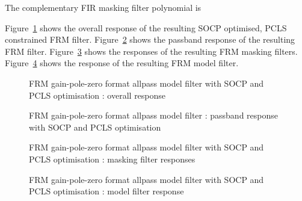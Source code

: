 \documentclass[a4paper,twoside,10pt,english]{report}
\begin{document}
The complementary FIR masking filter polynomial is
\begin{small}

\end{small}
Figure~\ref{fig:iir-frm-allpass-socp-pcls-response} 
shows the overall response of the resulting SOCP optimised, PCLS constrained
FRM filter. 
Figure~\ref{fig:iir-frm-allpass-socp-pcls-passband-response} 
shows the passband response of the resulting FRM filter. 
Figure~\ref{fig:iir-frm-allpass-socp-pcls-mask-response} 
shows the responses of the resulting FRM masking filters. 
Figure~\ref{fig:iir-frm-allpass-socp-pcls-model-response} 
shows the response of the resulting FRM model filter.
\begin{figure}[!htbp]
\begin{center}
\scalebox{0.7}{}
\caption{FRM gain-pole-zero format allpass model filter with SOCP and PCLS optimisation : overall response}
\label{fig:iir-frm-allpass-socp-pcls-response}
\end{center}
\end{figure}
\begin{figure}[!htbp]
\begin{center}
\scalebox{0.7}{}
\caption{FRM gain-pole-zero format allpass model filter : passband response with SOCP and PCLS optimisation}
\label{fig:iir-frm-allpass-socp-pcls-passband-response}
\end{center}
\end{figure}
\begin{figure}[!htbp]
\begin{center}
\scalebox{0.7}{}
\caption{FRM gain-pole-zero format allpass model filter with SOCP and PCLS optimisation : masking filter responses}
\label{fig:iir-frm-allpass-socp-pcls-mask-response}
\end{center}
\end{figure}
\begin{figure}[!htbp]
\begin{center}
\scalebox{0.7}{}
\caption{FRM gain-pole-zero format allpass model filter with SOCP and PCLS optimisation : model filter response}
\label{fig:iir-frm-allpass-socp-pcls-model-response}
\end{center}
\end{figure}
\clearpage
\end{document}
